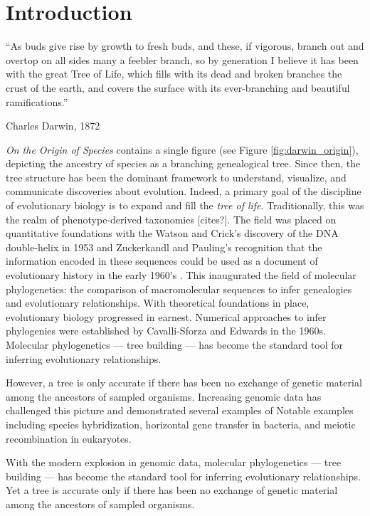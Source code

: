 \chapter{Introduction}
\label{ch:introduction}

\epigraph{``As buds give rise by growth to fresh buds, and these, if vigorous, branch out and overtop on all sides many a feebler branch, so by generation I believe it has been with the great Tree of Life, which fills with its dead and broken branches the crust of the earth, and covers the surface with its ever-branching and beautiful ramifications.''}{Charles Darwin, 1872}

\emph{On the Origin of Species} contains a single figure (see Figure \ref{fig:darwin_origin}), depicting the ancestry of species as a branching genealogical tree.
Since then, the tree structure has been the dominant framework to understand, visualize, and communicate discoveries about evolution.
Indeed, a primary goal of the discipline of evolutionary biology is to expand and fill the \emph{tree of life}.
Traditionally, this was the realm of phenotype-derived taxonomies [cites?].
The field was placed on quantitative foundations with the Watson and Crick's discovery of the DNA double-helix in 1953 \cite{Watson:1953wm} and Zuckerkandl and Pauling's recognition that the information encoded in these sequences could be used as a document of evolutionary history in the early 1960's \cite{Zuckerkandl:1962,Zuckerkandl:1965wi}.
This inaugurated the field of molecular phylogenetics: the comparison of macromolecular sequences to infer genealogies and evolutionary relationships.
With theoretical foundations in place, evolutionary biology progressed in earnest.
Numerical approaches to infer phylogenies were established by Cavalli-Sforza and Edwards in the 1960s.
Molecular phylogenetics --- tree building --- has become the standard tool for inferring evolutionary relationships.

However, a tree is only accurate if there has been no exchange of genetic material among the ancestors of sampled organisms.
Increasing genomic data has challenged this picture and demonstrated several examples of
Notable examples including species hybridization, horizontal gene transfer in bacteria, and meiotic recombination in eukaryotes.

With the modern explosion in genomic data, molecular phylogenetics –-- tree building –-- has become the standard tool for inferring evolutionary relationships. 
Yet a tree is accurate only if there has been no exchange of genetic material among the ancestors of sampled organisms.

